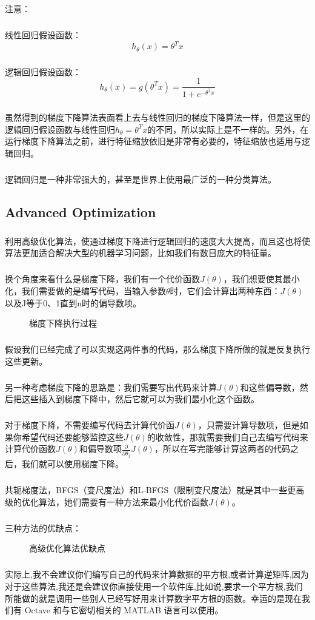 \documentclass{article}
\begin{document}
\begin{CJK}{UTF8}{gbsn}
\subparagraph{}
注意：
\subparagraph{}
线性回归假设函数：
\begin{equation}
h_\theta(x)=\theta^Tx
\end{equation}
\subparagraph{}
逻辑回归假设函数：
\begin{equation}
h_\theta(x)=g(\theta^Tx)=\frac{1}{1+e^{-\theta^Tx}}
\end{equation}
\subparagraph{}
虽然得到的梯度下降算法表面看上去与线性回归的梯度下降算法一样，但是这里的逻辑回归假设函数与线性回归$h_\theta=\theta^Tx$的不同，所以实际上是不一样的。另外，在运行梯度下降算法之前，进行特征缩放依旧是非常有必要的，特征缩放也适用与逻辑回归。
\subparagraph{}
逻辑回归是一种非常强大的，甚至是世界上使用最广泛的一种分类算法。
\subsection{Advanced Optimization}
\subparagraph{}
利用高级优化算法，使通过梯度下降进行逻辑回归的速度大大提高，而且这也将使算法更加适合解决大型的机器学习问题，比如我们有数目庞大的特征量。
\subparagraph{}
换个角度来看什么是梯度下降，我们有一个代价函数$J(\theta)$，我们想要使其最小化，我们需要做的是编写代码，当输入参数$\theta$时，它们会计算出两种东西：$J(\theta)$以及J等于0、1直到n时的偏导数项。
\begin{figure}[H]
\caption{梯度下降执行过程}
\label{fig:328}
\end{figure}
\subparagraph{}
假设我们已经完成了可以实现这两件事的代码，那么梯度下降所做的就是反复执行这些更新。
\subparagraph{}
另一种考虑梯度下降的思路是：我们需要写出代码来计算$J(\theta)$和这些偏导数，然后把这些插入到梯度下降中，然后它就可以为我们最小化这个函数。
\subparagraph{}
对于梯度下降，不需要编写代码去计算代价函$J(\theta)$，只需要计算导数项，但是如果你希望代码还要能够监控这些$J(\theta)$的收敛性，那就需要我们自己去编写代码来计算代价函数$J(\theta)$和偏导数项$\frac{\partial}{\partial\theta_j}J(\theta)$，所以在写完能够计算这两者的代码之后，我们就可以使用梯度下降。
\subparagraph{}
共轭梯度法，BFGS（变尺度法）和L-BFGS（限制变尺度法）就是其中一些更高级的优化算法，她们需要有一种方法来最小化代价函数$J(\theta)$。
\subparagraph{}
三种方法的优缺点：
\begin{figure}[H]
\caption{高级优化算法优缺点}
\label{fig:329}
\end{figure}
\subparagraph{}
实际上,我不会建议你们编写自己的代码来计算数据的平方根,或者计算逆矩阵,因为对于这些算法,我还是会建议你直接使用一个软件库,比如说,要求一个平方根,我们所能做的就是调用一些别人已经写好用来计算数字平方根的函数。幸运的是现在我们有 Octave 和与它密切相关的 MATLAB 语言可以使用。

\end{CJK}
\end{document}
